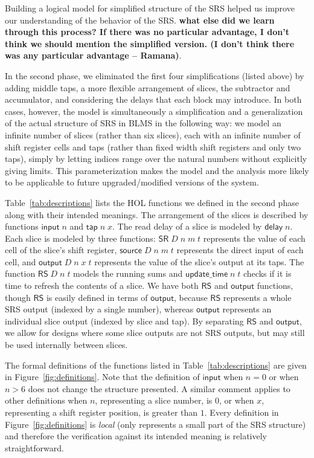 \documentclass{llncs}
\begin{document}
Building a logical model for simplified structure of the SRS helped us improve our understanding of the behavior of the SRS.
{\bf what else did we learn through this process? If there was no particular advantage, I don't think we should mention the simplified version.
(I don't think there was any particular advantage -- Ramana)}.

In the second phase, we eliminated the first four simplifications (listed above) by adding middle taps, a more flexible arrangement of slices, the subtractor and accumulator, and considering the delays that each block may introduce.
In both cases, however, the model is simultaneously a simplification and a generalization of the actual structure of SRS in BLMS in the following way: we model an infinite number of slices (rather than six slices), each with an infinite number of shift register cells and taps (rather than fixed width shift registers and only two taps), simply by letting indices range over the natural numbers without explicitly giving limits.
This parameterization makes the model and the analysis more likely to be applicable to future upgraded/modified versions of the system.

Table~\ref{tab:descriptions} lists the HOL functions we defined in the second phase along with their intended meanings.
The arrangement of the slices is described by functions $\mathsf{input}\;n$ and $\mathsf{tap}\;n\;x$.
The read delay of a slice is modeled by $\mathsf{delay}\;n$.
Each slice is modeled by three functions: $\mathsf{SR}\;D\;n\;m\;t$ represents the value of each cell of the slice's shift register, $\mathsf{source}\;D\;n\;m\;t$ represents the direct input of each cell, and $\mathsf{output}\;D\;n\;x\;t$ represents the value of the slice's output at its taps.
The function $\mathsf{RS}\;D\;n\;t$ models the running sums and $\mathsf{update\_time}\;n\;t$ checks if it is time to refresh the contents of a slice.
We have both $\mathsf{RS}$ and $\mathsf{output}$ functions, though $\mathsf{RS}$ is easily defined in terms of $\mathsf{output}$, because $\mathsf{RS}$ represents a whole SRS output (indexed by a single number), whereas $\mathsf{output}$ represents an individual slice output (indexed by slice and tap).
By separating $\mathsf{RS}$ and $\mathsf{output}$, we allow for designs where some slice outputs are not SRS outputs, but may still be used internally between slices.

The formal definitions of the functions listed in Table~\ref{tab:descriptions} are given in Figure~\ref{fig:definitions}.
Note that the definition of $\mathsf{input}$ when $n=0$ or when $n>6$ does not change the structure presented. %
A similar comment applies to other definitions when $n$, representing a slice number, is $0$, or when $x$, representing a shift register position, is greater than $1$.
Every definition in Figure~\ref{fig:definitions} is \emph{local} (only represents a small part of the SRS structure) and therefore the verification against its intended meaning is relatively straightforward.
\end{document}

